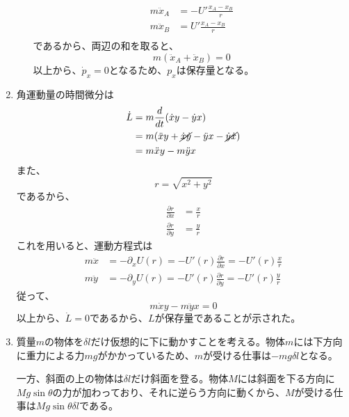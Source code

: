 \documentclass{jsarticle}
\begin{document}
\begin{enumerate}
\begin{enumerate}
                $$
                  \begin{aligned}
                    m\ddot{x}_A & = -U' \frac{x_A - x_B}{r} \\
                    m\ddot{x}_B & = U' \frac{x_A - x_B}{r}  \\
                  \end{aligned}
                $$
                であるから、両辺の和を取ると、
                $$
                  m (\ddot{x}_A + \ddot{x}_B) = 0
                $$
                以上から、$\dot{p}_x=0$となるため、$p_x$は保存量となる。
        \end{enumerate}
  \item 角運動量の時間微分は
        $$
          \begin{aligned}
            \dot{L} & = m \frac{d}{dt} (\dot{x} y - \dot{y} x)                                         \\
                    & = m (\ddot{x} y + \cancel{\dot{x}\dot{y}} - \ddot{y}x - \cancel{\dot{y}\dot{x}}) \\
                    & = m \ddot{x} y - m \ddot{y} x                                                    \\
          \end{aligned}
        $$
        また、
        $$
          r = \sqrt{x^2+y^2}
        $$
        であるから、
        $$
          \begin{aligned}
            \frac{\partial r}{\partial x} & = \frac{x}{r} \\
            \frac{\partial r}{\partial y} & = \frac{y}{r}
          \end{aligned}
        $$
        これを用いると、運動方程式は
        $$
          \begin{aligned}
            m \ddot{x} & = - \partial_x U(r) = -U'(r) \frac{\partial r}{\partial x}= - U'(r) \frac{x}{r} \\
            m \ddot{y} & = - \partial_y U(r) = -U'(r) \frac{\partial r}{\partial y}= - U'(r) \frac{y}{r}
          \end{aligned}
        $$
        従って、
        $$
          m \dot{x} y - m\ddot{y} x = 0
        $$
        以上から、$\dot{L}=0$であるから、$L$が保存量であることが示された。
  \item 質量$m$の物体を$\delta l$だけ仮想的に下に動かすことを考える。物体$m$には下方向に重力による力$mg$がかかっているため、$m$が受ける仕事は$-mg \delta l$となる。

        一方、斜面の上の物体は$\delta l$だけ斜面を登る。物体$M$には斜面を下る方向に$Mg \sin \theta$の力が加わっており、それに逆らう方向に動くから、$M$が受ける仕事は$Mg \sin \theta \delta l$である。


\end{enumerate}
\end{document}
